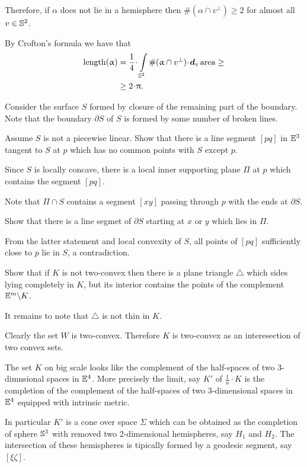 Therefore, if $\alpha$ does not lie in a hemisphere then
$\#(\alpha\cap v^\perp) \ge 2$ for almost all $v\in\SS^2$.  

By Crofton's formula we have that
\begin{align*}
\length(\alpha)
&=\frac 1 4\cdot \int\limits_{\SS^2}\#(\alpha\cap v^\perp)\cdot \d_v\area\ge
\\
&\ge2\cdot\pi.
\end{align*}
\qedsf

Consider the surface $S$ 
formed by closure of the remaining part of the boundary.
Note that the boundary $\partial S$ of $S$ is formed by some number of broken lines.

Assume $S$ is not a piecewise linear.
Show that there is a line segment $[pq]$ in $\mathbb{E}^3$ tangent to $S$ at $p$ which has no common points with $S$ except $p$.

Since $S$ is locally concave,
there is a local inner supporting plane $\Pi$ at $p$ which contains the segment $[pq]$.

Note that $\Pi\cap S$ contains a segment $[xy]$ passing through $p$ with the ends at $\partial S$.

Show that there is a line segmet of $\partial S$ starting at $x$ or $y$ which lies in $\Pi$.

From the latter statement and local convexity of $S$, 
all points of $[pq]$ sufficiently close to $p$ lie in $S$,
a contradiction.
\qeds


Show that if $K$ is not two-convex then there is a plane triangle $\triangle$ which sides lying completely in $K$, 
but its interior contains the points of the complement $\mathbb{E}^m\backslash K$.

It remains to note that $\triangle$ is not thin in $K$.
\qeds

Clearly the set $W$ is two-convex.
Therefore $K$ is two-convex as an interesection of two convex sets.

The set $K$ on big scale looks like the complement of the half-spaces of two 3-dimnsional spaces in $\mathbb{E}^4$.
More precisely the limit, say $K'$ of $\tfrac1n\cdot K$ is 
the completion of the complement of the half-spaces of two 3-dimensional spaces in $\mathbb{E}^4$ equipped with intrinsic metric.

In particular $K'$ is a cone over space $\Sigma$ which 
can be obtained as the completion of sphere $\mathbb{S}^3$ with removed two 2-dimensional hemispheres, say $H_1$ and $H_2$.
The intersection of these hemispheres is tipically formed by a geodesic segment, say $[\xi\zeta]$.

